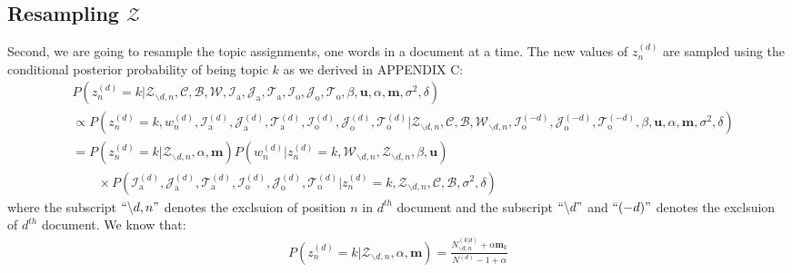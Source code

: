 \documentclass[a4paper]{article}
\begin{document}
  \subsection{Resampling $\mathcal{Z}$}  \label{subsec: Resampling Z}
Second, we are going to resample the topic assignments, one words in a document at a time.  The new values of $z^{(d)}_n$ are sampled using the conditional posterior probability of being topic $k$ as we derived in APPENDIX C:
 \begin{equation}
 \begin{aligned} & 
 P(z^{(d)}_n=k|\mathcal{Z}_{\backslash d, n},   \mathcal{C},   \mathcal{B},\mathcal{W}, \mathcal{I}_{\mbox{a}}, \mathcal{J}_{\mbox{a}}, \mathcal{T}_{\mbox{a}}, \mathcal{I}_{\mbox{o}}, \mathcal{J}_{\mbox{o}}, \mathcal{T}_{\mbox{o}}, \beta, \boldsymbol{u}, \alpha, \boldsymbol{m}, \sigma^2, \delta)\\
 & \propto P(z^{(d)}_n=k, w^{(d)}_n, \mathcal{I}^{(d)}_{\mbox{a}}, \mathcal{J}^{(d)}_{\mbox{a}}, \mathcal{T}^{(d)}_{\mbox{a}}, \mathcal{I}^{(d)}_{\mbox{o}}, \mathcal{J}^{(d)}_{\mbox{o}}, \mathcal{T}^{(d)}_{\mbox{o}}|\mathcal{Z}_{\backslash d, n}, \mathcal{C},   \mathcal{B},\mathcal{W}_{\backslash d, n}, \mathcal{I}^{(-d)}_{\mbox{o}}, \mathcal{J}^{(-d)}_{\mbox{o}}, \mathcal{T}^{(-d)}_{\mbox{o}}, \beta, \boldsymbol{u}, \alpha, \boldsymbol{m}, \sigma^2, \delta)\\
 &=P(z^{(d)}_n=k|\mathcal{Z}_{\backslash d, n}, \alpha, \boldsymbol{m})P(w^{(d)}_n|z^{(d)}_n=k, \mathcal{W}_{\backslash d, n}, \mathcal{Z}_{\backslash d, n}, \beta, \boldsymbol{u} )\\&\quad\quad \times P(\mathcal{I}^{(d)}_{\mbox{a}}, \mathcal{J}^{(d)}_{\mbox{a}}, \mathcal{T}^{(d)}_{\mbox{a}}, \mathcal{I}^{(d)}_{\mbox{o}}, \mathcal{J}^{(d)}_{\mbox{o}}, \mathcal{T}^{(d)}_{\mbox{o}}| z^{(d)}_n=k, \mathcal{Z}_{\backslash d, n}, \mathcal{C}, \mathcal{B}, \sigma^2, \delta)
 \end{aligned}
 \end{equation}
 where the subscript $``{\backslash d, n}"$ denotes the exclsuion of position $n$ in $d^{th}$ document and the subscript $``{\backslash d}"$ and $``{(-d)}"$ denotes the exclsuion of $d^{th}$ document. We know that:
 \begin{equation}
 \begin{aligned} 
 P(z^{(d)}_n=k|\mathcal{Z}_{\backslash d, n}, \alpha, \boldsymbol{m})=\frac{N^{(k|d)}_{\backslash d, n}+\alpha \boldsymbol{m}_k}{N^{(d)}-1+\alpha}
 \end{aligned}
 \end{equation}
\end{document}
